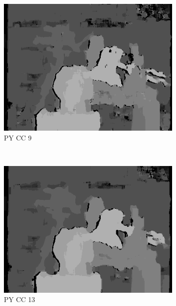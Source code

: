 \begin{figure}
  \begin{subfigure}[b]{0.23\textwidth}
    \centering
    \includegraphics[width=\textwidth]{images/stereo-pairs/tsukuba_pyramid_crosschecked_9.png}
    \caption{PY CC 9}
  \end{subfigure}
  ~
  \begin{subfigure}[b]{0.23\textwidth}
    \centering
    \includegraphics[width=\textwidth]{images/stereo-pairs/tsukuba_pyramid_crosschecked_13.png}
    \caption{PY CC 13}
  \end{subfigure}
  ~
  \begin{subfigure}[b]{0.23\textwidth}
    \centering

\end{subfigure}
\end{figure}
